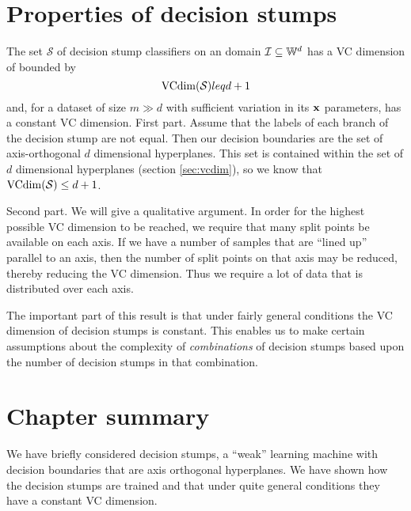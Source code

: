 \section{Properties of decision stumps}

\begin{theorem}
\label{theorem:vcdim stumps}
The set $\mathcal{S}$ of decision stump classifiers on an domain
$\mathcal{I} \subseteq \mathbb{W}^d$ has a VC dimension of bounded by 
%
\begin{equation}
\mathrm{VCdim}(\mathcal{S}) leq d + 1
\end{equation}
%
and, for a dataset of size $m \gg d$ with sufficient variation in its
$\mathbf{x}$ parameters, has a constant VC dimension.
%
\proof First part.  Assume that the labels of each branch of the decision
stump are not equal.  Then  our decision boundaries are the set of
axis-orthogonal $d$ dimensional hyperplanes.  This set is contained
within the set of $d$ dimensional hyperplanes (section \ref{sec:vcdim}), so
we know that $\mathrm{VCdim}(\mathcal{S}) \leq d+1$.

Second part.  We will give a qualitative argument.  In order for the
highest possible VC dimension to be reached, we require that many
split points be available on each axis.  If we have a number of
samples that are ``lined up'' parallel to an axis, then the number of
split points on that axis may be reduced, thereby reducing the VC
dimension.  Thus we require a lot of data that is distributed over
each axis.
\end{theorem}

The important part of this result is that under fairly general
conditions the VC dimension of decision stumps is constant.  This
enables us to make certain assumptions about the complexity of
\emph{combinations} of decision stumps based upon the number of
decision stumps in that combination.

\section{Chapter summary}

We have briefly considered decision stumps, a ``weak'' learning
machine with decision boundaries that are axis orthogonal
hyperplanes.  We have shown how the decision stumps are trained and
that under quite general conditions they have a constant VC dimension.




